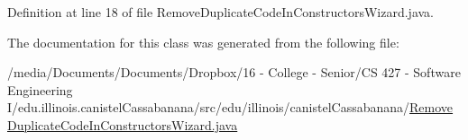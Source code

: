 Definition at line 18 of file RemoveDuplicateCodeInConstructorsWizard.java.



The documentation for this class was generated from the following file:\begin{DoxyCompactItemize}
\item 
/media/Documents/Documents/Dropbox/16 -\/ College -\/ Senior/CS 427 -\/ Software Engineering I/edu.illinois.canistelCassabanana/src/edu/illinois/canistelCassabanana/\hyperlink{RemoveDuplicateCodeInConstructorsWizard_8java}{RemoveDuplicateCodeInConstructorsWizard.java}\end{DoxyCompactItemize}
